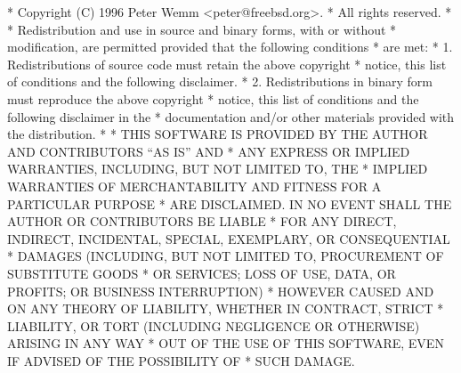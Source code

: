 \begin{copyrightEnv}
 * Copyright (C) 1996 Peter Wemm <peter@freebsd.org>.
 * All rights reserved.
 *
 * Redistribution and use in source and binary forms, with or without
 * modification, are permitted provided that the following conditions
 * are met:
 * 1. Redistributions of source code must retain the above copyright
 *    notice, this list of conditions and the following disclaimer.
 * 2. Redistributions in binary form must reproduce the above copyright
 *    notice, this list of conditions and the following disclaimer in the
 *    documentation and/or other materials provided with the distribution.
 *
 * THIS SOFTWARE IS PROVIDED BY THE AUTHOR AND CONTRIBUTORS ``AS IS'' AND
 * ANY EXPRESS OR IMPLIED WARRANTIES, INCLUDING, BUT NOT LIMITED TO, THE
 * IMPLIED WARRANTIES OF MERCHANTABILITY AND FITNESS FOR A PARTICULAR PURPOSE
 * ARE DISCLAIMED.  IN NO EVENT SHALL THE AUTHOR OR CONTRIBUTORS BE LIABLE
 * FOR ANY DIRECT, INDIRECT, INCIDENTAL, SPECIAL, EXEMPLARY, OR CONSEQUENTIAL
 * DAMAGES (INCLUDING, BUT NOT LIMITED TO, PROCUREMENT OF SUBSTITUTE GOODS
 * OR SERVICES; LOSS OF USE, DATA, OR PROFITS; OR BUSINESS INTERRUPTION)
 * HOWEVER CAUSED AND ON ANY THEORY OF LIABILITY, WHETHER IN CONTRACT, STRICT
 * LIABILITY, OR TORT (INCLUDING NEGLIGENCE OR OTHERWISE) ARISING IN ANY WAY
 * OUT OF THE USE OF THIS SOFTWARE, EVEN IF ADVISED OF THE POSSIBILITY OF
 * SUCH DAMAGE.
\end{copyrightEnv}

